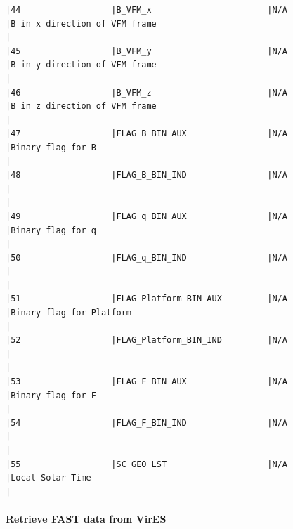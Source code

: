 \begin{verbatim}
|44                  |B_VFM_x                       |N/A                           |B in x direction of VFM frame                                                                       |
|45                  |B_VFM_y                       |N/A                           |B in y direction of VFM frame                                                                       |
|46                  |B_VFM_z                       |N/A                           |B in z direction of VFM frame                                                                       |
|47                  |FLAG_B_BIN_AUX                |N/A                           |Binary flag for B                                                                                   |
|48                  |FLAG_B_BIN_IND                |N/A                           |                                                                                                    |
|49                  |FLAG_q_BIN_AUX                |N/A                           |Binary flag for q                                                                                   |
|50                  |FLAG_q_BIN_IND                |N/A                           |                                                                                                    |
|51                  |FLAG_Platform_BIN_AUX         |N/A                           |Binary flag for Platform                                                                            |
|52                  |FLAG_Platform_BIN_IND         |N/A                           |                                                                                                    |
|53                  |FLAG_F_BIN_AUX                |N/A                           |Binary flag for F                                                                                   |
|54                  |FLAG_F_BIN_IND                |N/A                           |                                                                                                    |
|55                  |SC_GEO_LST                    |N/A                           |Local Solar Time                                                                                    |
\end{verbatim}

\paragraph{Retrieve FAST data from VirES}

